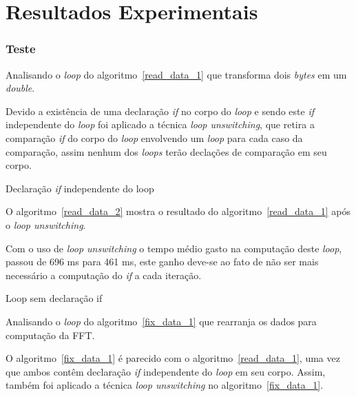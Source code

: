 
\chapter{Resultados Experimentais}

\subsection{Teste}
Analisando o \textit{loop} do algoritmo~\ref{read_data_1} que 
transforma dois \textit{bytes} em um \textit{double}.

Devido a existência de uma declaração \textit{if} no corpo do \textit{loop} e
sendo este \textit{if} independente do \textit{loop} foi
aplicado a técnica \textit{loop unswitching}, que retira a comparação
\textit{if} do corpo do \textit{loop} envolvendo um \textit{loop} para cada caso
da comparação, assim nenhum dos \textit{loops} terão declações de comparação em seu
corpo.

\begin{algorithm}
    \caption{Declaração \textit{if} independente do loop}
    \label{read_data_1}

\end{algorithm}

O algoritmo~\ref{read_data_2} mostra o resultado do algoritmo~\ref{read_data_1} 
após o \textit{loop unswitching}.

Com o uso de \textit{loop unswitching} o tempo médio gasto na computação deste
\textit{loop}, passou de 696 ms para 461 ms, este ganho deve-se ao fato de não
ser mais necessário a computação do \textit{if} a cada iteração. 


\begin{algorithm}
    \caption{Loop sem declaração if }
    \label{read_data_2}

\end{algorithm}


Analisando o \textit{loop} do algoritmo~\ref{fix_data_1} que rearranja os dados
para computação da FFT. 

O algoritmo~\ref{fix_data_1} é parecido com o algoritmo~\ref{read_data_1}, uma
vez que ambos contêm declaração \textit{if} independente do \textit{loop} em seu corpo. 
Assim, também foi aplicado a técnica \textit{loop unswitching} no
algoritmo~\ref{fix_data_1}.


